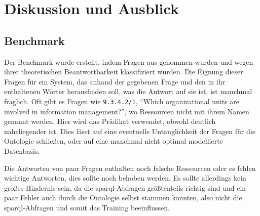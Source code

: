 \chapter{Diskussion und Ausblick}\label{ch:discussion}

\section{Benchmark}

Der Benchmark wurde erstellt, indem Fragen aus \citet{bb} genommen wurden und wegen ihrer theoretischen Beantwortbarkeit klassifiziert wurden.
Die Eignung dieser Fragen für ein System, das anhand der gegebenen Frage und den in ihr enthaltenen Wörter herausfinden soll, was die Antwort auf sie ist, ist manchmal fraglich.
Oft gibt es Fragen wie \texttt{9.3.4.2/1}, \enquote{Which organizational units are involved in information management?}, wo Ressourcen nicht mit ihrem Namen genannt werden.
Hier wird das Prädikat  verwendet, obwohl  deutlich naheliegender ist.
Dies lässt auf eine eventuelle Untauglichkeit der Fragen für die Ontologie schließen, oder auf eine manchmal nicht optimal modellierte Datenbasis.

Die Antworten von paar Fragen enthalten noch falsche Ressourcen oder es fehlen wichtige Antworten, dies sollte noch behoben werden.
Es sollte allerdings kein großes Hindernis sein, da die \ac{sparql}-Abfragen größtenteils richtig sind und ein paar Fehler auch durch die Ontologie selbst stammen könnten,
also nicht die \ac{sparql}-Abfragen und somit das Training beeinflussen.

